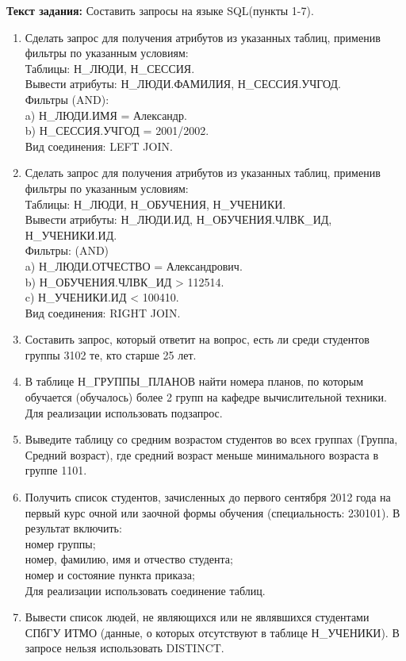 \documentclass[11pt,a4paper]{article}
\begin{document}
	\newpage
	\begin{flushleft}
		\textbf{{\large Текст задания:}}
		Составить запросы на языке SQL(пункты 1-7).
		\begin{enumerate}
			\item Сделать запрос для получения атрибутов из указанных таблиц, применив фильтры по указанным условиям:\\
				Таблицы: Н\_ЛЮДИ, Н\_СЕССИЯ.\\
				Вывести атрибуты: Н\_ЛЮДИ.ФАМИЛИЯ, Н\_СЕССИЯ.УЧГОД.\\
				Фильтры (AND):\\
				a) Н\_ЛЮДИ.ИМЯ = Александр.\\
				b) Н\_СЕССИЯ.УЧГОД = 2001/2002.\\
				Вид соединения: LEFT JOIN.
			\item Сделать запрос для получения атрибутов из указанных таблиц, применив фильтры по указанным условиям:\\
				Таблицы: Н\_ЛЮДИ, Н\_ОБУЧЕНИЯ, Н\_УЧЕНИКИ.\\
				Вывести атрибуты: Н\_ЛЮДИ.ИД, Н\_ОБУЧЕНИЯ.ЧЛВК\_ИД, Н\_УЧЕНИКИ.ИД.\\
				Фильтры: (AND)\\
				a) Н\_ЛЮДИ.ОТЧЕСТВО = Александрович.\\
				b) Н\_ОБУЧЕНИЯ.ЧЛВК\_ИД > 112514.\\
				c) Н\_УЧЕНИКИ.ИД < 100410.\\
				Вид соединения: RIGHT JOIN.
			\item Составить запрос, который ответит на вопрос, есть ли среди студентов группы 3102 те, кто старше 25 лет.
			\item В таблице Н\_ГРУППЫ\_ПЛАНОВ найти номера планов, по которым обучается (обучалось) более 2 групп на кафедре вычислительной техники.\\
				Для реализации использовать подзапрос.
			\item Выведите таблицу со средним возрастом студентов во всех группах (Группа, Средний возраст), где средний возраст меньше минимального возраста в группе 1101.
			\item Получить список студентов, зачисленных до первого сентября 2012 года на первый курс очной или заочной формы обучения (специальность: 230101). В результат включить:\\
				номер группы;\\
				номер, фамилию, имя и отчество студента;\\
				номер и состояние пункта приказа;\\
				Для реализации использовать соединение таблиц.
			\item Вывести список людей, не являющихся или не являвшихся студентами СПбГУ ИТМО (данные, о которых отсутствуют в таблице Н\_УЧЕНИКИ). В запросе нельзя использовать DISTINCT.
		\end{enumerate}
		

\end{flushleft}
\end{document}
